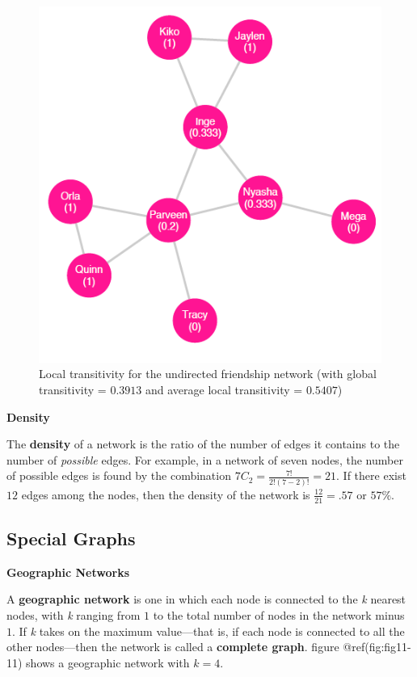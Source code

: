 \documentclass{book}
\begin{document}
\begin{figure}
\hypertarget{fig:fig11-10}{%
\centering
\includegraphics{images/social-networks/11-10.png}
\caption{Local transitivity for the undirected friendship network (with global
transitivity = \(0.3913\) and average local transitivity =
\(0.5407\))}\label{fig:fig11-10}
}
\end{figure}

\textbf{Density}

The \textbf{density} of a network is the ratio of the number of edges it
contains to the number of \emph{possible} edges. For example, in a network of
seven nodes, the number of possible edges is found by the combination
\(7C_2 = \frac{7!}{2!(7 - 2)!} = 21\). If there exist \(12\) edges among the
nodes, then the density of the network is \(\frac{12}{21} = .57\) or \(57\%\).

\hypertarget{special-graphs}{%
\subsection{Special Graphs}\label{special-graphs}}

\textbf{Geographic Networks}

A \textbf{geographic network} is one in which each node is connected to the
\emph{k} nearest nodes, with \emph{k} ranging from \(1\) to the total number
of nodes in the network minus \(1\). If \emph{k} takes on the maximum
value---that is, if each node is connected to all the other nodes---then the
network is called a \textbf{complete graph}. figure @ref(fig:fig11-11) shows a
geographic network with \(k = 4\).
\end{document}
